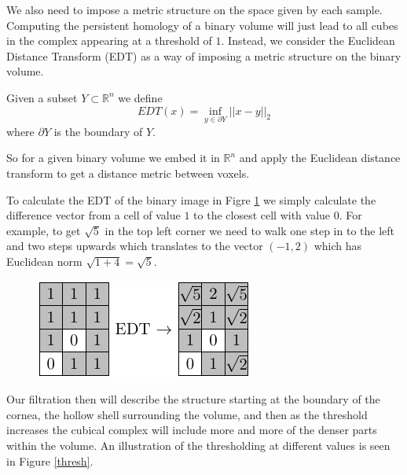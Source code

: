 We also need to impose a metric structure on the space given by each sample. Computing the persistent homology of a binary volume will just lead to all cubes in the complex appearing at a threshold of $1$. Instead, we consider the Euclidean Distance Transform (EDT) as a way of imposing a metric structure on the binary volume.

\begin{definition}
  Given a subset $Y \subset \mathbb{R}^{n}$ we define
   \[EDT(x) = \inf_{y \in \partial Y} ||x - y||_2\]
   where $\partial Y$ is the boundary of $Y$.
\end{definition}
So for a given binary volume we embed it in $\mathbb{R}^{n}$ and apply the Euclidean distance transform to get a distance metric between voxels.


\begin{example}
  To calculate the EDT of the binary image in Figre \ref{edt} we simply calculate the difference vector from a cell of value $1$ to the closest cell with value $0$. For example, to get $\sqrt 5$ in the top left corner we need to walk one step in to the left and two steps upwards which translates to the vector $(-1,2)$ which has Euclidean norm $\sqrt{1+4}=\sqrt{5}$.
  \begin{figure}[ht]
    \centering
    \includegraphics[scale=1.5]{edttransform.pdf}
    \caption{\label{edt} }
  \end{figure}

\end{example}

Our filtration then will describe the structure starting at the boundary of the cornea, the hollow shell surrounding the volume, and then as the threshold increases the cubical complex will include more and more of the denser parts within the volume. An illustration of the thresholding at different values is seen in Figure \ref{thresh}.

